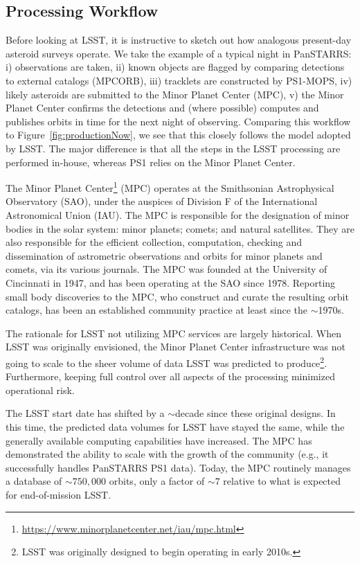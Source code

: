 \documentclass[DM,authoryear,toc]{lsstdoc}
\begin{document}
\subsection{Processing Workflow\label{sec:promptSSP}}

Before looking at LSST, it is instructive to sketch out how analogous present-day asteroid surveys operate. We take the example of a typical night in PanSTARRS: i) observations are taken, ii) known objects are flagged by comparing detections to external catalogs (MPCORB), iii) tracklets are constructed by PS1-MOPS, iv) likely asteroids are submitted to the Minor Planet Center (MPC), v) the Minor Planet Center confirms the detections and (where possible) computes and publishes orbits in time for the next night of observing.
Comparing this workflow to Figure~\ref{fig:productionNow}, we see that this closely follows the model adopted by LSST. The major difference is that all the steps in the LSST processing are performed in-house, whereas PS1 relies on the Minor Planet Center.

The Minor Planet Center\footnote{\url{https://www.minorplanetcenter.net/iau/mpc.html}} (MPC) operates at the Smithsonian Astrophysical Observatory (SAO), under the auspices of Division F of the International Astronomical Union (IAU). The MPC is responsible for the designation of minor bodies in the solar system: minor planets; comets; and natural satellites. They are also responsible for the efficient collection, computation, checking and dissemination of astrometric observations and orbits for minor planets and comets, via its various journals. The MPC was founded at the University of Cincinnati in 1947, and has been operating at the SAO since 1978. Reporting small body discoveries to the MPC, who construct and curate the resulting orbit catalogs, has been an established community practice at least since the $\sim$1970s.

The rationale for LSST not utilizing MPC services are largely historical. When LSST was originally envisioned, the Minor Planet Center infrastructure was not going to scale to the sheer volume of data LSST was predicted to produce\footnote{LSST was originally designed to begin operating in early 2010s.}. Furthermore, keeping full control over all aspects of the processing minimized operational risk.

The LSST start date has shifted by a $\sim$decade since these original designs. In this time, the predicted data volumes for LSST have stayed the same, while the generally available computing capabilities have increased. The MPC has demonstrated the ability to scale with the growth of the community (e.g., it successfully handles PanSTARRS PS1 data). Today, the MPC routinely manages a database of $\sim 750,000$ orbits, only a factor of $\sim 7$ relative to what is expected for end-of-mission LSST.
\end{document}
